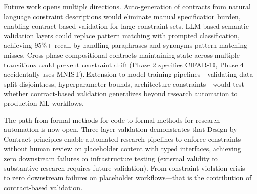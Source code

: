 Future work opens multiple directions. Auto-generation of contracts from natural language constraint descriptions would eliminate manual specification burden, enabling contract-based validation for large constraint sets. LLM-based semantic validation layers could replace pattern matching with prompted classification, achieving 95\%+ recall by handling paraphrases and synonyms pattern matching misses. Cross-phase compositional contracts maintaining state across multiple transitions could prevent constraint drift (Phase 2 specifies CIFAR-10, Phase 4 accidentally uses MNIST). Extension to model training pipelines---validating data split disjointness, hyperparameter bounds, architecture constraints---would test whether contract-based validation generalizes beyond research automation to production ML workflows.

The path from formal methods for code to formal methods for research automation is now open. Three-layer validation demonstrates that Design-by-Contract principles enable automated research pipelines to enforce constraints without human review on placeholder content with typed interfaces, achieving zero downstream failures on infrastructure testing (external validity to substantive research requires future validation). From constraint violation crisis to zero downstream failures on placeholder workflows---that is the contribution of contract-based validation.
